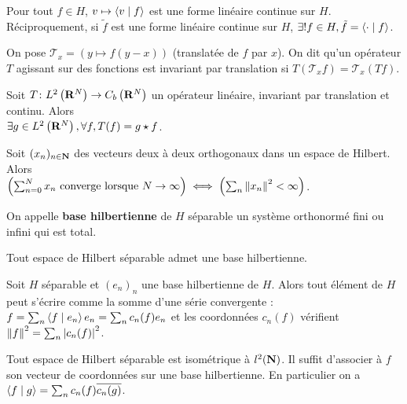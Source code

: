 \begin{thm}[Riesz]
	Pour tout $f \in H$, $v \mapsto \left\langle v \mid f \right\rangle$ est une forme linéaire continue sur $H$.
	Réciproquement, si $\tilde{f}$ est une forme linéaire continue sur $H$, $\exists ! f \in H, \tilde{f} = \left\langle \cdot \mid f \right\rangle$.
\end{thm}

\begin{defn}
	On pose $\mathcal{T}_x = (y \mapsto f(y - x))$ (translatée de $f$ par $x$).
	On dit qu'un opérateur $T$ agissant sur des fonctions est invariant par translation si $T(\mathcal{T}_x f) = \mathcal{T}_x (T f)$.
\end{defn}

\begin{thm}
	Soit $T \colon L^2 \left( \mathbf{R}^N \right) \to C_b \left( \mathbf{R}^N \right)$ un opérateur linéaire, invariant par translation et continu.
	Alors\\ $\exists g \in L^2 \left( \mathbf{R}^N \right), \forall f, T(f) = g \star f$.
\end{thm}

\begin{pop}
	Soit $(x_n)_{n \in \mathbf{N}}$ des vecteurs deux à deux orthogonaux dans un espace de Hilbert.
	Alors\\ $\left( \sum_{n = 0}^N x_n \text{ converge lorsque } N \to \infty \right) \iff \left( \sum_n \left\lVert x_n\right\rVert^2 < \infty \right)$.
\end{pop}

\begin{defn}
	On appelle \textbf{base hilbertienne} de $H$ séparable un système orthonormé fini ou infini qui est total.
\end{defn}

\begin{thm}
	Tout espace de Hilbert séparable admet une base hilbertienne.
\end{thm}

\begin{thm}
	Soit $H$ séparable et $(e_n)_n$ une base hilbertienne de $H$.
	Alors tout élément de $H$ peut s'écrire comme la somme d'une série convergente : $f = \sum_n \left\langle f \mid e_n \right\rangle e_n = \sum_n c_n(f) e_n$ et les coordonnées $c_n(f)$ vérifient $\left\lVert f\right\rVert^2 = \sum_n \left\lvert c_n(f)\right\rvert^2$.
\end{thm}

\begin{cor}
	Tout espace de Hilbert séparable est isométrique à $l^2 (\mathbf{N})$.
	Il suffit d'associer à $f$ son vecteur de coordonnées sur une base hilbertienne.
	En particulier on a $\left\langle f \mid g \right\rangle = \sum_n c_n(f) \overline{c_n(g)}$.
\end{cor}

